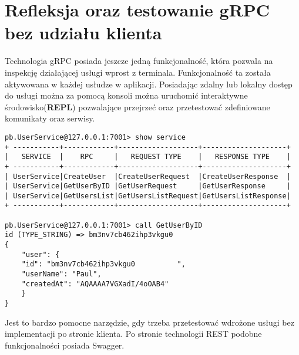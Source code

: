 \section{Refleksja oraz testowanie gRPC bez udziału klienta}
Technologia gRPC posiada jeszcze jedną funkcjonalność, która pozwala na inspekcję działającej usługi wprost z terminala. Funkcjonalność ta została aktywowana w każdej usłudze w aplikacji. Posiadając zdalny lub lokalny dostęp do usługi można za pomocą konsoli można uruchomić interaktywne środowisko(\textbf{REPL}) pozwalające przejrzeć oraz przetestować zdefiniowane komunikaty oraz serwisy. 
\begin{lstlisting}[caption=Przykad wykorzystania reflekcji]
pb.UserService@127.0.0.1:7001> show service                                 
+ -----------+------------+-------------------+--------------------+ 
|   SERVICE  |    RPC     |   REQUEST TYPE    |   RESPONSE TYPE    | 
+ -----------+------------+-------------------+--------------------+ 
| UserService|CreateUser  |CreateUserRequest  |CreateUserResponse  | 
| UserService|GetUserByID |GetUserRequest     |GetUserResponse     | 
| UserService|GetUsersList|GetUsersListRequest|GetUsersListResponse| 
+ -----------+------------+-------------------+--------------------+ 
                                                                
pb.UserService@127.0.0.1:7001> call GetUserByID                             
id (TYPE_STRING) => bm3nv7cb462ihp3vkgu0                                    
{                                                                           
    "user": {                                                                 
    "id": "bm3nv7cb462ihp3vkgu0          ",                                 
    "userName": "Paul",                                                     
    "createdAt": "AQAAAA7VGXadI/4oOAB4"                                     
    }                                                                         
}                                                                               
\end{lstlisting}
Jest to bardzo pomocne narzędzie, gdy trzeba przetestować wdrożone usługi bez implementacji po stronie klienta. Po stronie technologii REST podobne funkcjonalności posiada Swagger.         
